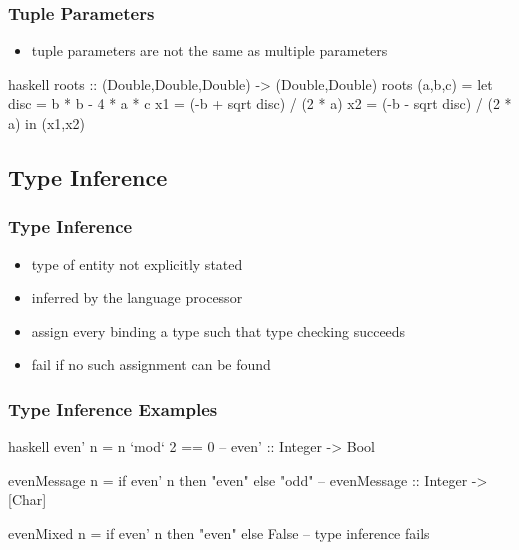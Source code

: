 \documentclass[dvipsnames]{beamer}
\theoremstyle{plain}
\begin{document}
\begin{frame}[fragile]
  \frametitle{Tuple Parameters}

  \begin{itemize}
    \item tuple parameters are not the same as multiple parameters
  \end{itemize}

  \begin{example}[Haskell]
    \begin{pygments}{haskell}
roots :: (Double,Double,Double) -> (Double,Double)
roots (a,b,c) =
    let
        disc = b * b - 4 * a * c
        x1 = (-b + sqrt disc) / (2 * a)
        x2 = (-b - sqrt disc) / (2 * a)
    in
        (x1,x2)
    \end{pygments}
  \end{example}
\end{frame}

\subsection{Type Inference}

\begin{frame}
  \frametitle{Type Inference}

  \begin{itemize}
    \item type of entity not explicitly stated
    \item inferred by the language processor

    \pause
    \medskip
    \item assign every binding a type such that type checking succeeds
    \item fail if no such assignment can be found
  \end{itemize}
\end{frame}

\begin{frame}[fragile]
  \frametitle{Type Inference Examples}

  \begin{example}[Haskell]
    \begin{pygments}{haskell}
even' n = n `mod` 2 == 0
-- even' :: Integer -> Bool

evenMessage n = if even' n then "even" else "odd"
-- evenMessage :: Integer -> [Char]

evenMixed n = if even' n then "even" else False
-- type inference fails
    \end{pygments}
  \end{example}
\end{frame}
\end{document}
